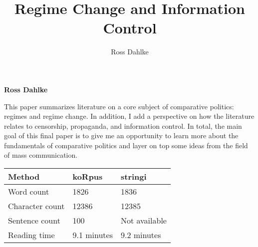\documentclass[12pt,]{article}
\title{Regime Change and Information Control  }
\author{\Large Ross Dahlke\vspace{0.05in} \newline\normalsize\emph{}  }
\date{}
\newcommand*{\authorfont}{\fontfamily{phv}\selectfont}
\renewenvironment{abstract}
 {{%
    \setlength{\leftmargin}{0mm}
    \setlength{\rightmargin}{\leftmargin}%
  }%
  \relax}
 {\endlist}
\begin{document}
	
%

{%
\setlength{\parindent}{0pt}
\thispagestyle{plain}
{\fontsize{18}{20}\selectfont\raggedright 
\maketitle  %

}

{
   \vskip 13.5pt\relax \normalsize\fontsize{11}{12} 
\textbf{\authorfont Ross Dahlke} \hskip 15pt \emph{\small }   

}

}








\begin{abstract}

    \hbox{\vrule height .2pt width 39.14pc}

    \vskip 8.5pt %

\noindent This paper summarizes literature on a core subject of comparative
politics: regimes and regime change. In addition, I add a perspective on
how the literature relates to censorship, propaganda, and information
control. In total, the main goal of this final paper is to give me an
opportunity to learn more about the fundamentals of comparative politics
and layer on top some ideas from the field of mass communication.


    \hbox{\vrule height .2pt width 39.14pc}


\end{abstract}


\vskip -8.5pt



\noindent \doublespacing 

\begin{longtable}[]{@{}lll@{}}
\toprule
Method & koRpus & stringi\tabularnewline
\midrule
\endhead
Word count & 1826 & 1836\tabularnewline
Character count & 12386 & 12385\tabularnewline
Sentence count & 100 & Not available\tabularnewline
Reading time & 9.1 minutes & 9.2 minutes\tabularnewline
\bottomrule
\end{longtable}
\end{document}
